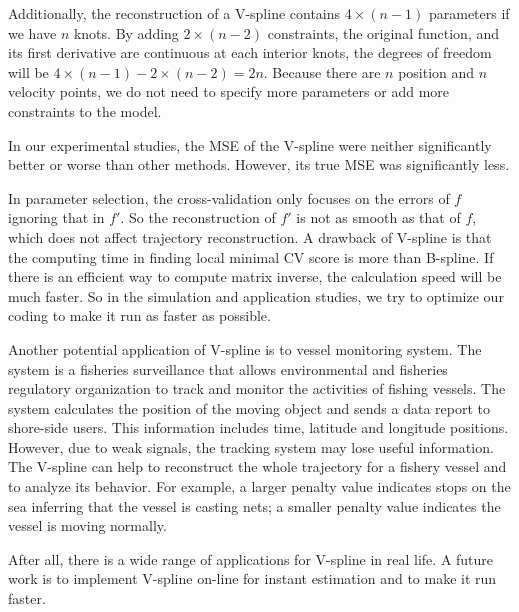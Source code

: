 Additionally, the reconstruction of a V-spline contains $4\times (n-1)$ parameters if we have $n$ knots. By adding $2\times (n-2)$ constraints, the original function, and its first derivative are continuous at each interior knots, the degrees of freedom will be $4\times (n-1)-2\times (n-2)=2n$. Because there are $n$ position and $n$ velocity points, we do not need to specify more parameters or add more constraints to the model. 

In our experimental studies, the MSE of the V-spline were neither significantly better or worse than other methods. However, its true MSE was significantly less. 

In parameter selection, the cross-validation only focuses on the errors of $f$ ignoring that in $f'$. So the reconstruction of $f'$ is not as smooth as that of $f$, which does not affect trajectory reconstruction. A drawback of V-spline is that the computing time in finding local minimal CV score is more than B-spline. If there is an efficient way to compute matrix inverse, the calculation speed will be much faster. So in the simulation and application studies, we try to optimize our coding to make it run as faster as possible.

Another potential application of V-spline is to vessel monitoring system. The system is a fisheries surveillance that allows environmental and fisheries regulatory organization to track and monitor the activities of fishing vessels. The system calculates the position of the moving object and sends a data report to shore-side users. This information includes time, latitude and longitude positions. However, due to weak signals, the tracking system may lose useful information. The V-spline can help to reconstruct the whole trajectory for a fishery vessel and to analyze its behavior. For example, a larger penalty value indicates stops on the sea inferring that the vessel is casting nets; a smaller penalty value indicates the vessel is moving normally. 

After all, there is a wide range of applications for V-spline in real life. A future work is to implement V-spline on-line for instant estimation and to make it run faster. 
